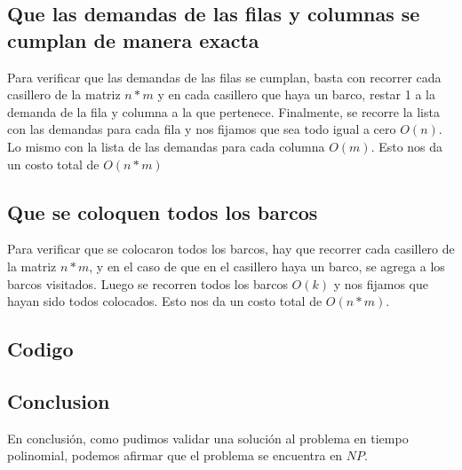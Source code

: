 \subsection{Que las demandas de las filas y columnas se cumplan de manera exacta}

    Para verificar que las demandas de las filas se cumplan, basta con recorrer cada casillero de la matriz $n * m$ y en cada casillero que haya un barco, restar 1 a la demanda de la fila y columna a la que pertenece.
    Finalmente, se recorre la lista con las demandas para cada fila y nos fijamos que sea todo igual a cero $O(n)$. Lo mismo con la lista de las demandas para cada columna $O(m)$. 
    Esto nos da un costo total de $O(n * m)$

\subsection{Que se coloquen todos los barcos}

    Para verificar que se colocaron todos los barcos, hay que recorrer cada casillero de la matriz $n * m$, y en el caso de que en el casillero haya un barco, se agrega a los barcos visitados.
    Luego se recorren todos los barcos $O(k)$ y nos fijamos que hayan sido todos colocados. Esto nos da un costo total de $O(n * m)$.

\subsection{Codigo}


\subsection{Conclusion}
\vskip0.25cm
En conclusión, como pudimos validar una solución al problema en tiempo polinomial, podemos afirmar que el problema se encuentra en $NP$.
